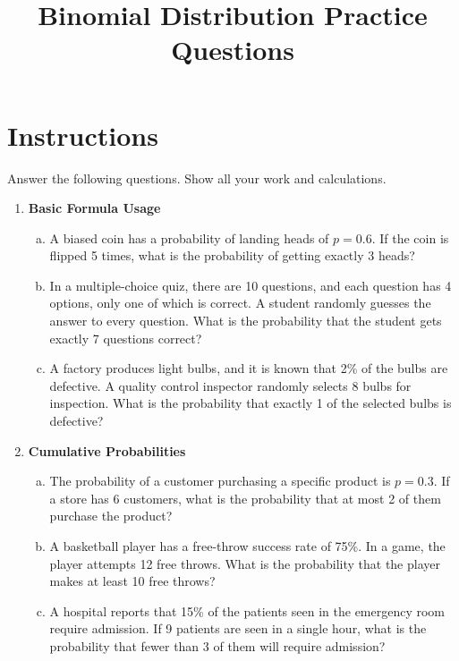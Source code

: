 \documentclass{article}
\begin{document}
\title{Binomial Distribution Practice Questions}
\author{}
\date{}
\maketitle

\section*{Instructions}
Answer the following questions. Show all your work and calculations.

\begin{enumerate}
    \item \textbf{Basic Formula Usage}
    \begin{enumerate}[a)]
        \item A biased coin has a probability of landing heads of $p=0.6$. If the coin is flipped 5 times, what is the probability of getting exactly 3 heads?
        \item In a multiple-choice quiz, there are 10 questions, and each question has 4 options, only one of which is correct. A student randomly guesses the answer to every question. What is the probability that the student gets exactly 7 questions correct?
        \item A factory produces light bulbs, and it is known that 2\% of the bulbs are defective. A quality control inspector randomly selects 8 bulbs for inspection. What is the probability that exactly 1 of the selected bulbs is defective?
    \end{enumerate}

    \item \textbf{Cumulative Probabilities}
    \begin{enumerate}[a)]
        \item The probability of a customer purchasing a specific product is $p=0.3$. If a store has 6 customers, what is the probability that at most 2 of them purchase the product?
        \item A basketball player has a free-throw success rate of 75\%. In a game, the player attempts 12 free throws. What is the probability that the player makes at least 10 free throws?
        \item A hospital reports that 15\% of the patients seen in the emergency room require admission. If 9 patients are seen in a single hour, what is the probability that fewer than 3 of them will require admission?
    \end{enumerate}


\end{enumerate}
\end{document}
